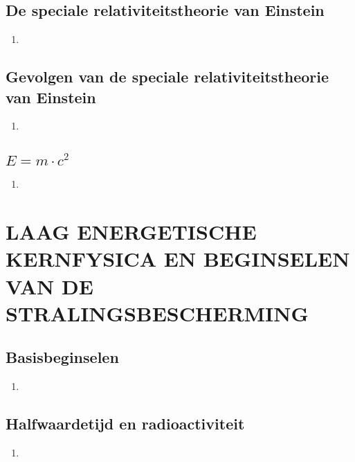 \documentclass[12pt]{article}
\begin{document}
    \subsection{De speciale relativiteitstheorie van Einstein}
    \begin{enumerate}
        \item 
    \end{enumerate}
    \subsection{Gevolgen van de speciale relativiteitstheorie van Einstein}
    \begin{enumerate}
        \item 
    \end{enumerate}
    \subsection{$E=m \cdot c^2$}
    \begin{enumerate}
        \item 
    \end{enumerate}



    \section{LAAG ENERGETISCHE KERNFYSICA EN BEGINSELEN VAN DE STRALINGSBESCHERMING}
    \subsection{Basisbeginselen}
    \begin{enumerate}
        \item 
    \end{enumerate}
    \subsection{Halfwaardetijd en radioactiviteit}
    \begin{enumerate}
        \item 
    \end{enumerate}
\end{document}
